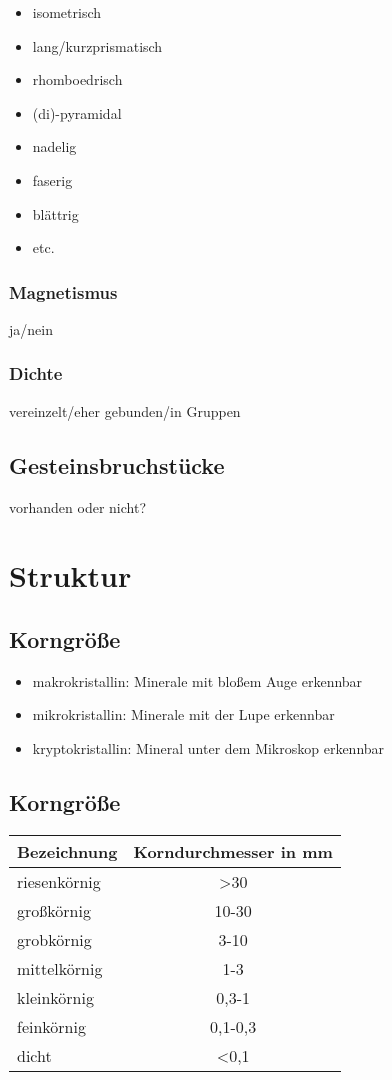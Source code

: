 \documentclass[a4, 12pt]{scrreprt}
\begin{document}
\begin{itemize}
\item isometrisch
\item lang/kurzprismatisch
\item rhomboedrisch
\item (di)-pyramidal
\item nadelig
\item faserig
\item blättrig
\item etc.
\end{itemize}

\subsection{Magnetismus}

ja/nein

\subsection{Dichte}

vereinzelt/eher gebunden/in Gruppen

\section{Gesteinsbruchstücke}

vorhanden oder nicht?

\chapter{Struktur}

\section{Korngröße}

\begin{itemize}
\item makrokristallin: Minerale mit bloßem Auge erkennbar
\item mikrokristallin: Minerale mit der Lupe erkennbar
\item kryptokristallin: Mineral unter dem Mikroskop erkennbar
\end{itemize}

\section{Korngröße}

\begin{center}
\begin{tabular}{lc}
Bezeichnung & Korndurchmesser in mm\\
\hline
riesenkörnig & >30\\
großkörnig & 10-30\\
grobkörnig & 3-10\\
mittelkörnig & 1-3\\
kleinkörnig & 0,3-1\\
feinkörnig & 0,1-0,3\\
dicht & <0,1\\
\end{tabular}
\end{center}
\end{document}
